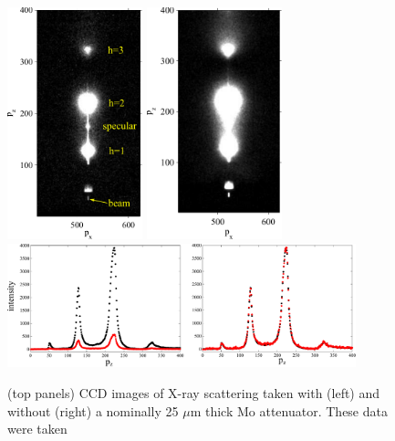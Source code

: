 \begin{figure}[jtbp]
  \centering
  \includegraphics[width=0.35\textwidth]{figures/ripple/MMs/laxs/olddopc045_labels}
  \includegraphics[width=0.35\textwidth]{figures/ripple/MMs/laxs/olddopc044}
  \includegraphics[width=0.9\textwidth]{figures/ripple/MMs/laxs/attenuator}
  \caption[(top panels) CCD images of X-ray scattering taken with (left) and without 
  (right) a nominally 25 $\mu$m thick Mo attenuator]
  {(top panels) CCD images of X-ray scattering taken with (left) and without 
  (right) a nominally 25 $\mu$m thick Mo attenuator. These data were taken 
}
\end{figure}
